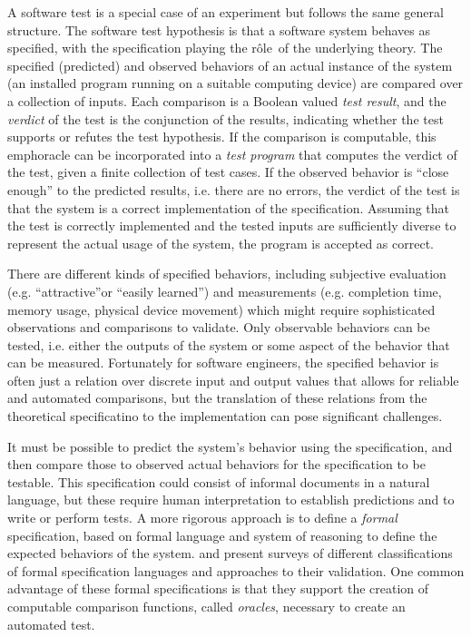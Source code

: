 \documentclass[11pt]{report}
\newcommand{\role}{r\^{o}le}
\begin{document}
A software test is a special case of an experiment
but follows the same general structure.
The software test hypothesis is that a software system behaves as specified,
with the specification playing the \role\ of the underlying theory.
The specified (predicted) and observed behaviors of an actual instance of the system
(an installed program running on a suitable computing device)
are compared over a collection of inputs.
Each comparison is a Boolean valued \emph{test result},
and the \emph{verdict} of the test is the conjunction of the results,
indicating whether the test supports or refutes the test hypothesis.
If the comparison is computable,
this emph{oracle} can be incorporated into a \emph{test program} that
computes the verdict of the test,
given a finite collection of test cases.
If the observed behavior is ``close enough'' to the predicted results, i.e. there are no errors,
the verdict of the test is that the system is a correct implementation of the specification.
Assuming that the test is correctly implemented and
the tested inputs are sufficiently diverse to represent the actual usage of the system,
the program is accepted as correct.

There are different kinds of specified behaviors,
including subjective evaluation (e.g. ``attractive''or ``easily learned'')
and measurements  (e.g. completion time, memory usage, physical device movement)
which might require sophisticated observations and comparisons to validate.
Only observable behaviors can be tested, 
i.e. either the outputs of the system or some aspect of the behavior that can be measured.
Fortunately for software engineers, 
the specified behavior is often 
just a relation over discrete input and output values
that allows for reliable and automated comparisons,
but the translation of these relations from the theoretical specificatino
to the implementation can pose significant challenges.

It must be possible to predict the system's behavior using the specification, 
and then compare those to observed actual behaviors
for the specification to be testable.
This specification could consist of informal documents in a natural language,
but these require human interpretation to establish predictions
and to write or perform tests.
A more rigorous approach is to define a \emph{formal} specification,
based on formal language and system of reasoning
to define the expected behaviors of the system.
\cite{ZhuHallMay1997}  and \cite{Hieronsetal2009} present surveys of
different classifications of formal specification languages
and approaches to their validation.
One common advantage of these formal specifications is that
they support the creation of computable comparison functions,
called \emph{oracles},
necessary to create an automated test.
\end{document}
